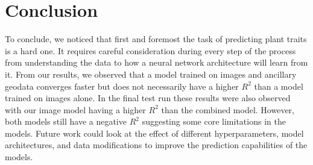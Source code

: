 \documentclass[12pt,a4paper,oneside]{article}
\begin{document}
\section{Conclusion}
To conclude, we noticed that first and foremost the task of predicting plant traits is a hard one. It requires careful consideration during every step of the process from understanding the data to how a neural network architecture will learn from it. From our results, we observed that a model trained on images and ancillary geodata converges faster but does not necessarily have a higher $R^2$ than a model trained on images alone. In the final test run these results were also observed with our image model having a higher $R^2$ than the combined model. However, both models still have a negative $R^2$ suggesting some core limitations in the models. Future work could look at the effect of different hyperparameters, model architectures, and data modifications to improve the prediction capabilities of the models.   

\printbibliography
\end{document}
